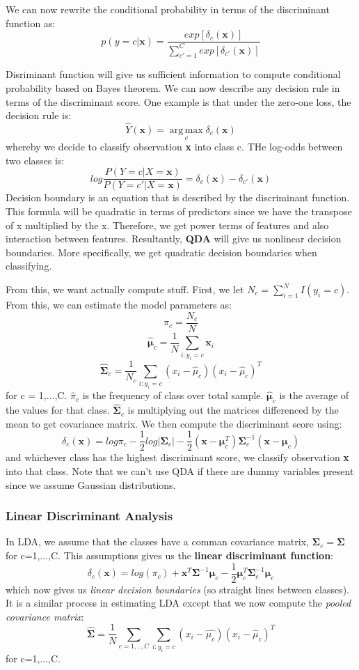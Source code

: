 \documentclass[11pt, oneside]{article}
\theoremstyle{definition}
\DeclareMathOperator*{\argmax}{arg\,max}
\begin{document}
We can now rewrite the conditional probability in terms of the discriminant function as:
$$
p(y=c|\bm{x}) = \frac{exp[\delta_c(\bm{x})]}{\sum\limits_{c'=1}^{C}exp[\delta_{c'}(\bm{x})]}
$$

Disriminant function will give us sufficient information to compute conditional probability based on Bayes theorem. We can now describe any decision rule in terms of the discriminant score. One example is that under the zero-one loss, the decision rule is:
$$
\hat{Y}(\bm{x}) = \argmax\limits_{c}\delta_c(\bm{x})
$$
whereby we decide to classify observation \textbf{x} into class c. THe log-odds between two classes is:
$$
log\frac{P(Y=c|X=\bm{x})}{P(Y=c'|X=\bm{x})} = \delta_c(\bm{x}) - \delta_{c'}(\bm{x})
$$
Decision boundary is an equation that is described by the discriminant function. This formula will be quadratic in terms of predictors since we have the transpose of x multiplied by the x. Therefore, we get power terms of features and also interaction between features. Resultantly, \textbf{QDA} will give us nonlinear decision boundaries. More specifically, we get quadratic decision boundaries when classifying.

From this, we want actually compute stuff. First, we let $N_c = \sum\limits_{i=1}^{N}I(y_i=c)$. From this, we can estimate the model parameters as:
$$
\hat{\pi}_c = \frac{N_c}{N}
$$
$$
\hat{\bm{\mu}}_c = \frac{1}{N}\sum\limits_{i:y_i = c}\bm{x}_i
$$
$$
\hat{\bm{\Sigma}}_c = \frac{1}{N_c}\sum\limits_{i:y_i=c}(x_i - \hat{\mu}_c)(x_i - \hat{\mu}_c)^T
$$
for c = 1,...,C. $\hat{\pi}_c$ is the frequency of class over total sample. $\hat{\bm{\mu}}_c$ is the average of the values for that class. $\hat{\bm{\Sigma}}_c$ is multiplying out the matrices differenced by the mean to get covariance matrix. We then compute the discriminant score using:
$$
\delta_c(\bm{x}) = log\pi_c - \frac{1}{2}log|\bm{\Sigma}_c| - \frac{1}{2}(\bm{x} - \bm{\mu}_c^T)\bm{\Sigma}_c^{-1}(\bm{x}-\bm{\mu}_c)
$$
and whichever class has the highest discriminant score, we classify observation \textbf{x} into that class. Note that we can't use QDA if there are dummy variables present since we assume Gaussian distributions.

\subsubsection{Linear Discriminant Analysis}
In LDA, we assume that the classes have a comman covariance matrix, $\bm{\Sigma}_c = \bm{\Sigma}$ for c=1,...,C. This assumptions gives us the \textbf{linear discriminant function}:
$$
\delta_c(\bm{x}) = log(\pi_c) + \bm{x}^T\bm{\Sigma}^{-1}\bm{\mu}_c - \frac{1}{2}\bm{\mu}_c^T\bm{\Sigma}_c^{-1}\bm{\mu}_c
$$
which now gives us \textit{linear decision boundaries} (so straight lines between classes). It is a similar process in estimating LDA except that we now compute the \textit{pooled covariance matrix}:
$$
\bm{\hat{\Sigma}} = \frac{1}{N}\sum\limits_{c=1,..,C}\sum\limits_{i:y_i = c}(x_i - \hat{\mu_c})(x_i - \hat{\mu}_c)^T
$$
for c=1,...,C.
\end{document}
